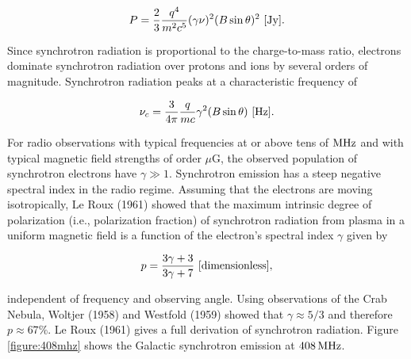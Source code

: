 \documentclass[a4paper,10pt]{article}
\begin{document}
\begin{align*}
    P = \frac{2}{3}\dfrac{q^4}{m^2c^5}(\gamma\nu)^2(B\sin\theta)^2 ~ [{\rm Jy}].
\end{align*}

{\noindent}Since synchrotron radiation is proportional to the charge-to-mass ratio, electrons dominate synchrotron radiation over protons and ions by several orders of magnitude. Synchrotron radiation peaks at a characteristic frequency of

\begin{align*}
    \nu_c = \dfrac{3}{4\pi}\dfrac{q}{mc}\gamma^2(B\sin\theta)~[{\rm Hz}].
\end{align*}

{\noindent}For radio observations with typical frequencies at or above tens of ${\rm MHz}$ and with typical magnetic field strengths of order $\mu$G, the observed population of synchrotron electrons have $\gamma\gg1$. Synchrotron emission has a steep negative spectral index in the radio regime. Assuming that the electrons are moving isotropically, Le Roux (1961) showed that the maximum intrinsic degree of polarization (i.e., polarization fraction) of synchrotron radiation from plasma in a uniform magnetic field is a function of the electron's spectral index $\gamma$ given by

\begin{align*}
    p = \frac{3\gamma + 3}{3\gamma+7} ~ [{\rm dimensionless}],
\end{align*}

{\noindent}independent of frequency and observing angle. Using observations of the Crab Nebula, Woltjer (1958) and Westfold (1959) showed that $\gamma\approx5/3$ and therefore $p\approx67\%$. Le Roux (1961) gives a full derivation of synchrotron radiation. Figure \ref{figure:408mhz} shows the Galactic synchrotron emission at $408\,{\rm MHz}$.
\end{document}
